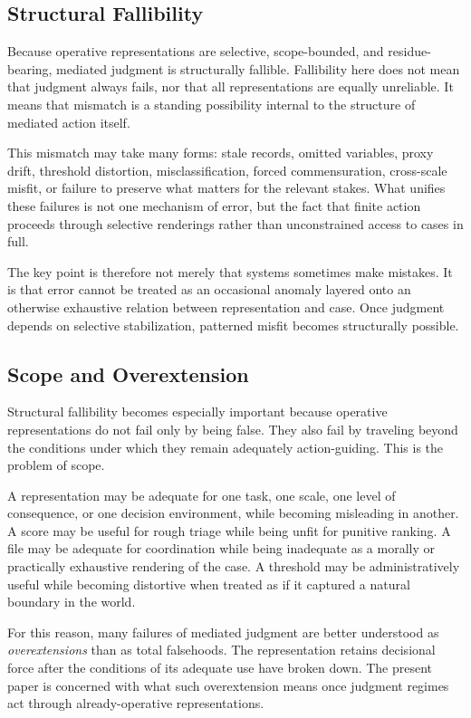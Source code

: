 \documentclass[11pt]{article}
\renewcommand{\emph}[1]{\textit{#1}}
\begin{document}
\subsection{Structural Fallibility}

Because operative representations are selective, scope-bounded, and residue-bearing, mediated judgment is structurally fallible. Fallibility here does not mean that judgment always fails, nor that all representations are equally unreliable. It means that mismatch is a standing possibility internal to the structure of mediated action itself.

This mismatch may take many forms: stale records, omitted variables, proxy drift, threshold distortion, misclassification, forced commensuration, cross-scale misfit, or failure to preserve what matters for the relevant stakes. What unifies these failures is not one mechanism of error, but the fact that finite action proceeds through selective renderings rather than unconstrained access to cases in full.

The key point is therefore not merely that systems sometimes make mistakes. It is that error cannot be treated as an occasional anomaly layered onto an otherwise exhaustive relation between representation and case. Once judgment depends on selective stabilization, patterned misfit becomes structurally possible.

\subsection{Scope and Overextension}

Structural fallibility becomes especially important because operative representations do not fail only by being false. They also fail by traveling beyond the conditions under which they remain adequately action-guiding. This is the problem of scope.

A representation may be adequate for one task, one scale, one level of consequence, or one decision environment, while becoming misleading in another. A score may be useful for rough triage while being unfit for punitive ranking. A file may be adequate for coordination while being inadequate as a morally or practically exhaustive rendering of the case. A threshold may be administratively useful while becoming distortive when treated as if it captured a natural boundary in the world.

For this reason, many failures of mediated judgment are better understood as \emph{overextensions} than as total falsehoods. The representation retains decisional force after the conditions of its adequate use have broken down. The present paper is concerned with what such overextension means once judgment regimes act through already-operative representations.
\end{document}
